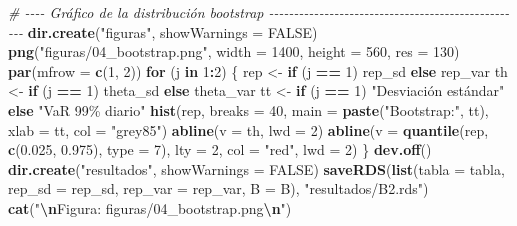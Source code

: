 \documentclass[
  spanish,
]{article}
\newenvironment{Shaded}{\begin{snugshade}}{\end{snugshade}}
\newcommand{\AttributeTok}[1]{\textcolor[rgb]{0.13,0.29,0.53}{#1}}
\newcommand{\CommentTok}[1]{\textcolor[rgb]{0.56,0.35,0.01}{\textit{#1}}}
\newcommand{\ConstantTok}[1]{\textcolor[rgb]{0.56,0.35,0.01}{#1}}
\newcommand{\ControlFlowTok}[1]{\textcolor[rgb]{0.13,0.29,0.53}{\textbf{#1}}}
\newcommand{\DecValTok}[1]{\textcolor[rgb]{0.00,0.00,0.81}{#1}}
\newcommand{\FloatTok}[1]{\textcolor[rgb]{0.00,0.00,0.81}{#1}}
\newcommand{\FunctionTok}[1]{\textcolor[rgb]{0.13,0.29,0.53}{\textbf{#1}}}
\newcommand{\NormalTok}[1]{#1}
\newcommand{\OtherTok}[1]{\textcolor[rgb]{0.56,0.35,0.01}{#1}}
\newcommand{\SpecialCharTok}[1]{\textcolor[rgb]{0.81,0.36,0.00}{\textbf{#1}}}
\newcommand{\StringTok}[1]{\textcolor[rgb]{0.31,0.60,0.02}{#1}}
\begin{document}
\begin{Shaded}
\begin{Highlighting}[]
\CommentTok{\# {-}{-}{-}{-} Gráfico de la distribución bootstrap {-}{-}{-}{-}{-}{-}{-}{-}{-}{-}{-}{-}{-}{-}{-}{-}{-}{-}{-}{-}{-}{-}{-}{-}{-}{-}{-}{-}{-}{-}{-}{-}{-}{-}{-}{-}{-}{-}{-}{-}{-}{-}{-}{-}{-}{-}{-}{-}{-}{-}{-}}
\FunctionTok{dir.create}\NormalTok{(}\StringTok{"figuras"}\NormalTok{, }\AttributeTok{showWarnings =} \ConstantTok{FALSE}\NormalTok{)}
\FunctionTok{png}\NormalTok{(}\StringTok{"figuras/04\_bootstrap.png"}\NormalTok{, }\AttributeTok{width =} \DecValTok{1400}\NormalTok{, }\AttributeTok{height =} \DecValTok{560}\NormalTok{, }\AttributeTok{res =} \DecValTok{130}\NormalTok{)}
\FunctionTok{par}\NormalTok{(}\AttributeTok{mfrow =} \FunctionTok{c}\NormalTok{(}\DecValTok{1}\NormalTok{, }\DecValTok{2}\NormalTok{))}
\ControlFlowTok{for}\NormalTok{ (j }\ControlFlowTok{in} \DecValTok{1}\SpecialCharTok{:}\DecValTok{2}\NormalTok{) \{}
\NormalTok{  rep }\OtherTok{\textless{}{-}} \ControlFlowTok{if}\NormalTok{ (j }\SpecialCharTok{==} \DecValTok{1}\NormalTok{) rep\_sd }\ControlFlowTok{else}\NormalTok{ rep\_var}
\NormalTok{  th  }\OtherTok{\textless{}{-}} \ControlFlowTok{if}\NormalTok{ (j }\SpecialCharTok{==} \DecValTok{1}\NormalTok{) theta\_sd }\ControlFlowTok{else}\NormalTok{ theta\_var}
\NormalTok{  tt  }\OtherTok{\textless{}{-}} \ControlFlowTok{if}\NormalTok{ (j }\SpecialCharTok{==} \DecValTok{1}\NormalTok{) }\StringTok{"Desviación estándar"} \ControlFlowTok{else} \StringTok{"VaR 99\% diario"}
  \FunctionTok{hist}\NormalTok{(rep, }\AttributeTok{breaks =} \DecValTok{40}\NormalTok{, }\AttributeTok{main =} \FunctionTok{paste}\NormalTok{(}\StringTok{"Bootstrap:"}\NormalTok{, tt), }\AttributeTok{xlab =}\NormalTok{ tt, }\AttributeTok{col =} \StringTok{"grey85"}\NormalTok{)}
  \FunctionTok{abline}\NormalTok{(}\AttributeTok{v =}\NormalTok{ th, }\AttributeTok{lwd =} \DecValTok{2}\NormalTok{)}
  \FunctionTok{abline}\NormalTok{(}\AttributeTok{v =} \FunctionTok{quantile}\NormalTok{(rep, }\FunctionTok{c}\NormalTok{(}\FloatTok{0.025}\NormalTok{, }\FloatTok{0.975}\NormalTok{), }\AttributeTok{type =} \DecValTok{7}\NormalTok{), }\AttributeTok{lty =} \DecValTok{2}\NormalTok{, }\AttributeTok{col =} \StringTok{"red"}\NormalTok{, }\AttributeTok{lwd =} \DecValTok{2}\NormalTok{)}
\NormalTok{\}}
\FunctionTok{dev.off}\NormalTok{()}
\FunctionTok{dir.create}\NormalTok{(}\StringTok{"resultados"}\NormalTok{, }\AttributeTok{showWarnings =} \ConstantTok{FALSE}\NormalTok{)}
\FunctionTok{saveRDS}\NormalTok{(}\FunctionTok{list}\NormalTok{(}\AttributeTok{tabla =}\NormalTok{ tabla, }\AttributeTok{rep\_sd =}\NormalTok{ rep\_sd, }\AttributeTok{rep\_var =}\NormalTok{ rep\_var, }\AttributeTok{B =}\NormalTok{ B), }\StringTok{"resultados/B2.rds"}\NormalTok{)}
\FunctionTok{cat}\NormalTok{(}\StringTok{"}\SpecialCharTok{\textbackslash{}n}\StringTok{Figura: figuras/04\_bootstrap.png}\SpecialCharTok{\textbackslash{}n}\StringTok{"}\NormalTok{)}
\end{Highlighting}
\end{Shaded}
\end{document}
